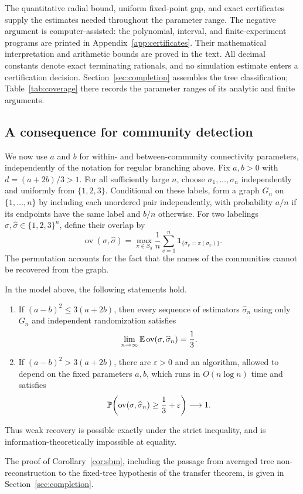 The quantitative radial bound, uniform fixed-point gap, and exact
certificates supply the estimates needed throughout the parameter range.
The negative argument is computer-assisted: the polynomial, interval,
and finite-experiment programs are printed in
Appendix~\ref{app:certificates}. Their mathematical interpretation and
arithmetic bounds are proved in the text. All decimal constants denote
exact terminating rationals, and no simulation estimate enters a
certification decision. Section~\ref{sec:completion} assembles the tree
classification; Table~\ref{tab:coverage} there records the parameter
ranges of its analytic and finite arguments.

\subsection{A consequence for community detection}\label{sec:sbm}
We now use $a$ and $b$ for within- and between-community connectivity
parameters, independently of the notation for regular branching above.
Fix $a,b>0$ with $d=(a+2b)/3>1$. For all sufficiently large $n$, choose
$\sigma_1,\ldots,\sigma_n$ independently and uniformly from $\{1,2,3\}$.
Conditional on these labels, form a graph $G_n$ on $\{1,\ldots,n\}$ by
including each unordered pair independently, with probability $a/n$ if
its endpoints have the same label and $b/n$ otherwise. For two labelings
$\sigma,\widehat\sigma\in\{1,2,3\}^n$, define their overlap by
\[
 \operatorname{ov}(\sigma,\widehat\sigma)
 =\max_{\pi\in S_3}\frac1n\sum_{v=1}^n
   \mathbf1_{\{\widehat\sigma_v=\pi(\sigma_v)\}}.
\]
The permutation accounts for the fact that the names of the communities
cannot be recovered from the graph.

\begin{corollary}
\label{cor:sbm}
In the model above, the following statements hold.
\begin{enumerate}[label=(\roman*)]
\item If $(a-b)^2\le 3(a+2b)$, then every sequence of estimators
$\widehat\sigma_n$ using only $G_n$ and independent randomization satisfies
\[
 \lim_{n\to\infty}\mathbb E\operatorname{ov}(\sigma,\widehat\sigma_n)=\frac13.
\]
\item If $(a-b)^2>3(a+2b)$, there are $\varepsilon>0$ and an algorithm,
allowed to depend on the fixed parameters $a,b$, which runs in
$O(n\log n)$ time and satisfies
\[
 \mathbb P\!\left(\operatorname{ov}(\sigma,\widehat\sigma_n)
              \ge\frac13+\varepsilon\right)\longrightarrow1.
\]
\end{enumerate}
Thus weak recovery is possible exactly under the strict inequality,
and is information-theoretically impossible at equality.
\end{corollary}

The proof of Corollary~\ref{cor:sbm}, including the passage from averaged
tree non-reconstruction to the fixed-tree hypothesis of the transfer
theorem, is given in Section~\ref{sec:completion}.

